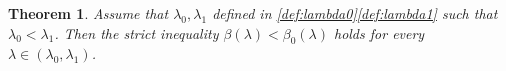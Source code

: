 \documentclass[reqno,11pt]{amsart}
\newtheorem{theorem}{Theorem}[section]
\theoremstyle{definition}
\numberwithin{equation}{section}
\newcommand{\1}{{{\bf 1}\kern-0,28em\rm l}}
\newcommand{\one}{{{\bf 1}\kern-0,28em\rm l}}
\newcommand{\med}{\medskip\noindent}
\def\l{\lambda}
\begin{document}
\begin{theorem}\label{beta<beta0} Assume that  $\l_0,\l_1$ defined in \eqref{def:lambda0}\eqref{def:lambda1} 
 such that $\l_0<\l_1$. Then the strict inequality  
$\beta(\lambda) < \beta_0(\lambda)$ holds for every $\lambda\in (\lambda_0,\lambda_1)$.
\end{theorem}
\end{document}
